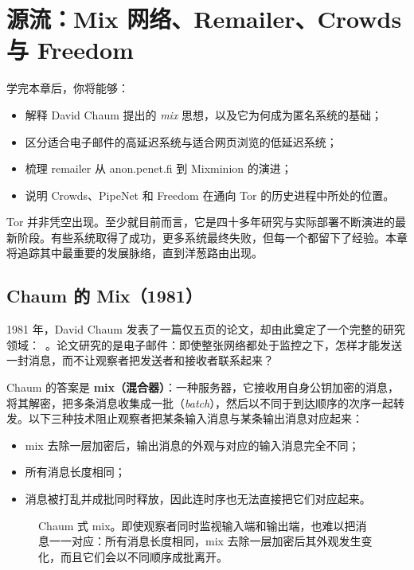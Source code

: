\chapter{源流：Mix 网络、Remailer、Crowds 与 Freedom}\label{cap:02-radici}

\begin{obiettivi}
学完本章后，你将能够：
\begin{itemize}[nosep]
  \item 解释 David Chaum 提出的 \emph{mix} 思想，以及它为何成为匿名系统的基础；
  \item 区分适合电子邮件的高延迟系统与适合网页浏览的低延迟系统；
  \item 梳理 remailer 从 anon.penet.fi 到 Mixminion 的演进；
  \item 说明 Crowds、PipeNet 和 Freedom 在通向 Tor 的历史进程中所处的位置。
\end{itemize}
\end{obiettivi}

Tor 并非凭空出现。至少就目前而言，它是四十多年研究与实际部署不断演进的最新阶段。有些系统取得了成功，更多系统最终失败，但每一个都留下了经验。本章将追踪其中最重要的发展脉络，直到洋葱路由出现。

\section{Chaum 的 Mix（1981）}\label{sec:radici-chaum}

1981 年，David Chaum 发表了一篇仅五页的论文，却由此奠定了一个完整的研究领域：~\cite{chaum1981untraceable}。论文研究的是电子邮件：即使整张网络都处于监控之下，怎样才能发送一封消息，而不让观察者把发送者和接收者联系起来？

Chaum 的答案是 \textbf{mix（混合器）}：一种服务器，它接收用自身公钥加密的消息，将其解密，把多条消息收集成一批（\emph{batch}），然后以不同于到达顺序的次序一起转发。以下三种技术阻止观察者把某条输入消息与某条输出消息对应起来：
\begin{itemize}
  \item mix 去除一层加密后，输出消息的外观与对应的输入消息完全不同；
  \item 所有消息长度相同；
  \item 消息被打乱并成批同时释放，因此连时序也无法直接把它们对应起来。
\end{itemize}
\begin{figure}[htbp]
\centering

\caption{Chaum 式 mix。即使观察者同时监视输入端和输出端，也难以把消息一一对应：所有消息长度相同，mix 去除一层加密后其外观发生变化，而且它们会以不同顺序成批离开。}
\label{fig:mix}
\end{figure}

